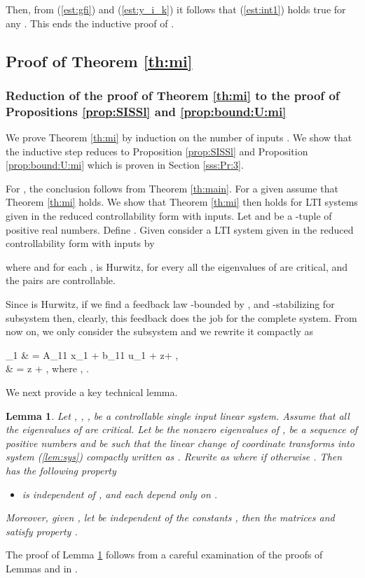 \documentclass[letterpaper, 10pt]{article}
\newtheorem{lem}{Lemma}
\newcommand{\rref}[1]{(\ref{#1})}
\begin{document}
Then, from \rref{est:gfi} and \rref{est:y_i_k} it follows that \rref{est:int1} holds true for any . This ends the inductive proof of .
\subsection{Proof of Theorem \ref{th:mi}}
\subsubsection{Reduction of the proof of Theorem \ref{th:mi} to the proof of Propositions \ref{prop:SISSl} and \ref{prop:bound:U:mi}}\label{sec:red:th2}
We prove Theorem \ref{th:mi} by induction on the number of inputs . We show that the inductive step reduces to Proposition \ref{prop:SISSl} and Proposition \ref{prop:bound:U:mi} which is proven in Section \ref{sss:Pr:3}.

For , the conclusion follows from Theorem \ref{th:main}. For a given  assume that Theorem \ref{th:mi} holds. We show that Theorem \ref{th:mi} then holds for LTI systems given in the reduced controllability form with  inputs. Let  and  be a -tuple of positive real numbers. Define . Given  consider a LTI system given in the reduced controllability form with  inputs by

where  and  for each ,  is Hurwitz, for every  all the eigenvalues of  are critical, and the pairs  are controllable. 

Since  is Hurwitz, if we find a  feedback law -bounded by , and -stabilizing for subsystem then, clearly, this feedback does the job for the complete system. From now on, we only consider the subsystem and we rewrite it compactly as 

_1 &  = A_{11} x_1 + b_{11} u_1 + z+ , \label{sys:mi:x} \\
 & =   z +  , \label{sys:mi:z}
 where , .


We next provide a key technical lemma.
\begin{lem}
\label{lem:struct:l}
Let , , , be a controllable single input linear system. Assume that all the eigenvalues of  are critical. Let  be the nonzero eigenvalues of ,  be a sequence of positive numbers and  be such that the linear change of coordinate  transforms  into system \rref{lem:sys} compactly written as . Rewrite  as  where  if  otherwise . 
Then  has the following property
\begin{itemize}
\item[ :]   is independent of , and each  depend only on .
\end{itemize}
 Moreover, given , let  be independent of the constants , then the matrices  and  satisfy property . 
\end{lem} The proof of Lemma \ref{lem:struct:l} follows from a careful examination of the proofs of Lemmas  and  in \cite{SSY}.
\end{document}
